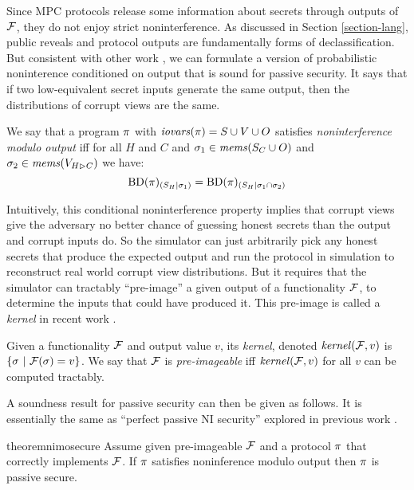Since MPC protocols release some information about secrets through
outputs of $\mathcal{F}$, they do not enjoy strict noninterference.  As
discussed in Section \ref{section-lang}, public reveals and protocol
outputs are fundamentally forms of declassification.  But consistent
with other work \cite{8429300}, we can formulate a version of
probabilistic noninterence conditioned on output that is sound
for passive security. It says that if two low-equivalent secret
inputs generate the same output, then the distributions of corrupt
views are the same. 
\begin{definition}
  \label{definition-NIMO}
  We say that a program $\pi$ with $\mathit{iovars}(\pi) = S \cup V \cup O$
  satisfies \emph{noninterference modulo output}
  iff for all $H$ and $C$ and $\sigma_1 \in \mathit{mems}(S_C \cup O)$ and $\sigma_2 \in \mathit{mems}(V_{H \rhd C})$
  we have:
  $$
  \mathrm{BD}(\pi)_{({S_H}|{\sigma_1})} = \mathrm{BD}(\pi)_{({S_H}|{\sigma_1 \cap \sigma_2})}
 $$
\end{definition}
Intuitively, this conditional noninterference property implies that
corrupt views give the adversary no better chance of guessing honest
secrets than the output and corrupt inputs do. So
the simulator can just arbitrarily pick any honest secrets that
produce the expected output and run the protocol in simulation to
reconstruct real world corrupt view distributions. But it requires
that the simulator can tractably ``pre-image'' a given output of
a functionality $\mathcal{F}$, to determine the inputs that
could have produced it. This pre-image is called a
\emph{kernel} in recent work \cite{XXX}.
\begin{definition}
  Given a functionality $\mathcal{F}$ and output value $v$, its
  \emph{kernel}, denoted $\mathit{kernel}(\mathcal{F},v)$ is
  $
  \{ \sigma\ |\ \mathcal{F}(\sigma) = v \}
  $.
  We say that $\mathcal{F}$ is \emph{pre-imageable} iff $\mathit{kernel}(\mathcal{F}, v)$ for all
  $v$ can be computed tractably.
\end{definition}
A soundness result for passive security can then be given as follows.
It is essentially the same as ``perfect passive NI security'' explored
in previous work \cite{8429300}.  
\begin{restatable}{theorem}{nimosecure}
  \label{theorem-nimo}
  Assume given pre-imageable $\mathcal{F}$ and a protocol $\pi$ that
  correctly implements $\mathcal{F}$.  If $\pi$ satisfies noninference modulo output
  then $\pi$ is passive secure.
\end{restatable}


